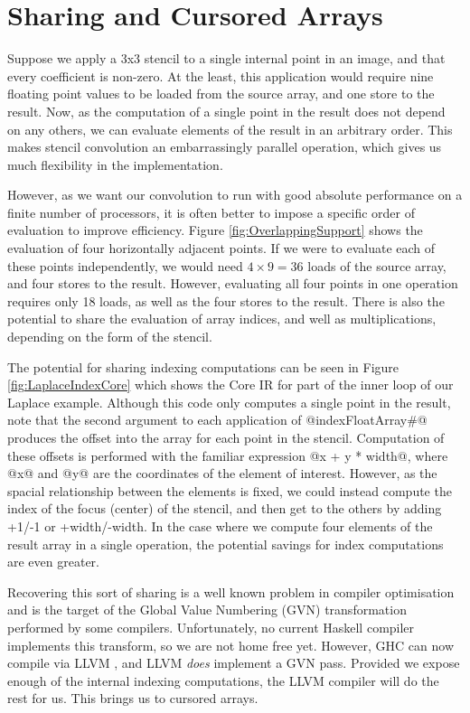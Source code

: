 
\section{Sharing and Cursored Arrays}
\label{sec:SharingAndCursoredArrays}
\label{sec:EvaluationOrder}

Suppose we apply a 3x3 stencil to a single internal point in an image, and that every coefficient is non-zero. At the least, this application would require nine floating point values to be loaded from the source array, and one store to the result. Now, as the computation of a single point in the result does not depend on any others, we can evaluate elements of the result in an arbitrary order. This makes stencil convolution an embarrassingly parallel operation, which gives us much flexibility in the implementation. 

However, as we want our convolution to run with good absolute performance on a finite number of processors, it is often better to impose a specific order of evaluation to improve efficiency. Figure \ref{fig:OverlappingSupport} shows the evaluation of four horizontally adjacent points. If we were to evaluate each of these points independently, we would need $4 \times 9 = 36$ loads of the source array, and four stores to the result. However, evaluating all four points in one operation requires only 18 loads, as well as the four stores to the result. There is also the potential to share the evaluation of array indices, and well as multiplications, depending on the form of the stencil.

The potential for sharing indexing computations can be seen in Figure \ref{fig:LaplaceIndexCore} which shows the Core IR for part of the inner loop of our Laplace example. Although this code only computes a single point in the result, note that the second argument to each application of @indexFloatArray#@ produces the offset into the array for each point in the stencil. Computation of these offsets is performed with the familiar expression @x + y * width@, where @x@ and @y@ are the coordinates of the element of interest. However, as the spacial relationship between the elements is fixed, we could instead compute the index of the focus (center) of the stencil, and then get to the others by adding +1/-1 or +width/-width. In the case where we compute four elements of the result array in a single operation, the potential savings for index computations are even greater. 

Recovering this sort of sharing is a well known problem in compiler optimisation and is the target of the Global Value Numbering (GVN) \cite{Alpern:detecting-equality-of-variables, Rosen:global-value-nubering} transformation performed by some compilers. Unfortunately, no current Haskell compiler implements this transform, so we are not home free yet. However, GHC can now compile via LLVM \cite{Terei:llvm-backend-for-ghc}, and LLVM \emph{does} implement a GVN pass. Provided we expose enough of the internal indexing computations, the LLVM compiler will do the rest for us. This brings us to cursored arrays.


